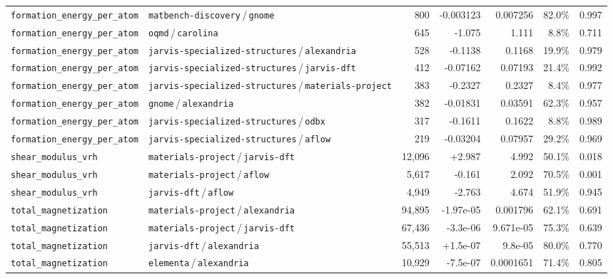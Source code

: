 \begin{longtable}{llrrrrr}
\texttt{formation\_energy\_per\_atom} & \texttt{matbench-discovery}\,/\,\texttt{gnome} & 800 & -0.003123 & 0.007256 & 82.0\% & 0.997 \\
\texttt{formation\_energy\_per\_atom} & \texttt{oqmd}\,/\,\texttt{carolina} & 645 & -1.075 & 1.111 & 8.8\% & 0.711 \\
\texttt{formation\_energy\_per\_atom} & \texttt{jarvis-specialized-structures}\,/\,\texttt{alexandria} & 528 & -0.1138 & 0.1168 & 19.9\% & 0.979 \\
\texttt{formation\_energy\_per\_atom} & \texttt{jarvis-specialized-structures}\,/\,\texttt{jarvis-dft} & 412 & -0.07162 & 0.07193 & 21.4\% & 0.992 \\
\texttt{formation\_energy\_per\_atom} & \texttt{jarvis-specialized-structures}\,/\,\texttt{materials-project} & 383 & -0.2327 & 0.2327 & 8.4\% & 0.977 \\
\texttt{formation\_energy\_per\_atom} & \texttt{gnome}\,/\,\texttt{alexandria} & 382 & -0.01831 & 0.03591 & 62.3\% & 0.957 \\
\texttt{formation\_energy\_per\_atom} & \texttt{jarvis-specialized-structures}\,/\,\texttt{odbx} & 317 & -0.1611 & 0.1622 & 8.8\% & 0.989 \\
\texttt{formation\_energy\_per\_atom} & \texttt{jarvis-specialized-structures}\,/\,\texttt{aflow} & 219 & -0.03204 & 0.07957 & 29.2\% & 0.969 \\
\texttt{shear\_modulus\_vrh} & \texttt{materials-project}\,/\,\texttt{jarvis-dft} & 12{,}096 & +2.987 & 4.992 & 50.1\% & 0.018 \\
\texttt{shear\_modulus\_vrh} & \texttt{materials-project}\,/\,\texttt{aflow} & 5{,}617 & -0.161 & 2.092 & 70.5\% & 0.001 \\
\texttt{shear\_modulus\_vrh} & \texttt{jarvis-dft}\,/\,\texttt{aflow} & 4{,}949 & -2.763 & 4.674 & 51.9\% & 0.945 \\
\texttt{total\_magnetization} & \texttt{materials-project}\,/\,\texttt{alexandria} & 94{,}895 & -1.97e-05 & 0.001796 & 62.1\% & 0.691 \\
\texttt{total\_magnetization} & \texttt{materials-project}\,/\,\texttt{jarvis-dft} & 67{,}436 & -3.3e-06 & 9.671e-05 & 75.3\% & 0.639 \\
\texttt{total\_magnetization} & \texttt{jarvis-dft}\,/\,\texttt{alexandria} & 55{,}513 & +1.5e-07 & 9.8e-05 & 80.0\% & 0.770 \\
\texttt{total\_magnetization} & \texttt{elementa}\,/\,\texttt{alexandria} & 10{,}929 & -7.5e-07 & 0.0001651 & 71.4\% & 0.805 \\

\end{longtable}
